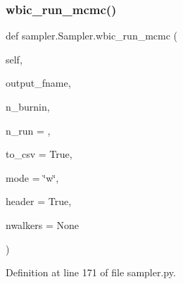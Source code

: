 \subsubsection{\texorpdfstring{wbic\+\_\+run\+\_\+mcmc()}{wbic\_run\_mcmc()}}
{\footnotesize\ttfamily def sampler.\+Sampler.\+wbic\+\_\+run\+\_\+mcmc (\begin{DoxyParamCaption}\item[{}]{self,  }\item[{}]{output\+\_\+fname,  }\item[{}]{n\+\_\+burnin,  }\item[{}]{n\+\_\+run = {},  }\item[{}]{to\+\_\+csv = {\ttfamily True},  }\item[{}]{mode = {\ttfamily \char`\"{}w\char`\"{}},  }\item[{}]{header = {\ttfamily True},  }\item[{}]{nwalkers = {\ttfamily None} }\end{DoxyParamCaption})}



Definition at line 171 of file sampler.\+py.


